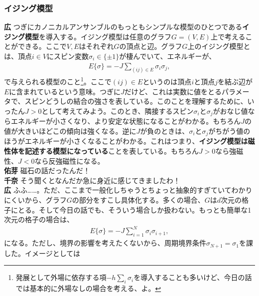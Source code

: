 \documentclass[paper=b5j,fontsize=12Q,jafontsize=12Q,baselineskip=21Q]{jlreq}
\DeclareRobustCommand{\hiron}{\textbf{広 }}
\DeclareRobustCommand{\chinan}{\textbf{千奈 }}
\DeclareRobustCommand{\umen}{\textbf{佑芽 }}
\begin{document}
\begin{refsection}
\subsubsection{イジング模型}
\hiron つぎにカノニカルアンサンブルのもっともシンプルな模型のひとつである\textbf{イジング模型}を導入する。イジング模型は任意のグラフ$G=(V,E)$上で考えることができる。ここで$V,E$はそれぞれ$G$の頂点と辺。グラフ$G$上のイジング模型とは、頂点$i\in V$にスピン変数$\sigma_i\in\{\pm1\}$が棲んでいて、エネルギーが、
\begin{align}
  E\{\sigma\}=-J\sum_{(ij)\in E}\sigma_i\sigma_j,
\end{align}
で与えられる模型のこと\footnote{発展として外場に依存する項$-h\sum_i\sigma_i$を導入することも多いけど、今日の話では基本的に外場なしの場合を考える、よ。}。ここで$(ij)\in E$というのは頂点$i$と頂点$j$を結ぶ辺が$E$に含まれているという意味。つぎに$J$だけど、これは実数に値をとるパラメータで、スピンどうしの結合の強さを表している。このことを理解するために、いったん$J>0$として考えてみよう。このとき、隣接するスピン$\sigma_i$と$\sigma_j$がおなじ値ならエネルギーが小さくなり、より安定な状態になることがわかる。もちろん$J$の値が大きいほどこの傾向は強くなる。逆に$J$が負のときは、$\sigma_i$と$\sigma_j$がちがう値のほうがエネルギーが小さくなることがわかる。これはつまり、\textbf{イジング模型は磁性体を記述する模型になっている}ことを表している。もちろん$J>0$なら強磁性、$J<0$なら反強磁性になる。
\\\umen 磁石の話だったんだ！
\\\chinan そう聞くとなんだか急に身近に感じてきましたわ！
\\\hiron ふふ……。ただ、ここまで一般化しちゃうとちょっと抽象的すぎていてわかりにくいから、グラフ$G$の部分をすこし具体化する。多くの場合、$G$は$d$次元の格子にとる。そして今日の話でも、そういう場合しか扱わない。もっとも簡単な1次元の格子の場合は、
\begin{align}
  E\{\sigma\}=-J\sum_{i=1}^N\sigma_i\sigma_{i+1},
\end{align}
になる。ただし、境界の影響を考えたくないから、周期境界条件$\sigma_{N+1}=\sigma_1$を課した。イメージとしては

\begin{center}
\end{center}


\end{refsection}
\end{document}
